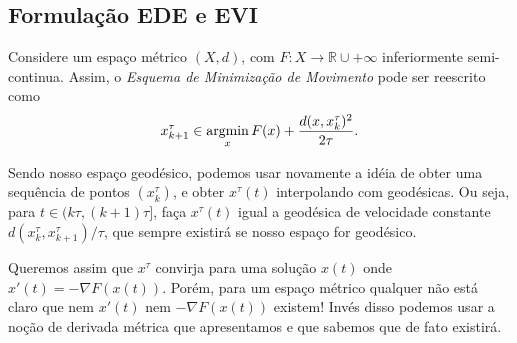 
\subsection{Formulação EDE e EVI}

Considere um espaço métrico $(X,d)$, com $F:X\to \mathbb R\cup{+\infty}$ inferiormente
semi-continua. Assim, o \textit{Esquema de Minimização de Movimento} pode ser
reescrito como
\begin{equation}
    x_{k+1}^\tau \in \mathop{\rm argmin}_x F(x) + \frac{d(x,x_k^\tau)^2}{2\tau}.
    \label{metricEMM}
\end{equation}

Sendo nosso espaço geodésico, podemos usar novamente a idéia de obter
uma sequência de pontos $(x_k^\tau)$, e obter $x^\tau(t)$ interpolando com geodésicas.
Ou seja, para $t \in (k\tau,(k+1)\tau]$, faça $x^\tau(t)$ igual a geodésica
de velocidade constante $d(x_k^\tau,x_{k+1}^\tau)/\tau$, que sempre existirá se
nosso espaço for geodésico.

Queremos assim que $x^\tau$ convirja para uma solução $x(t)$ onde
$x'(t) = -\nabla F(x(t))$. Porém, para um espaço métrico qualquer
não está claro que nem $x'(t)$ nem $-\nabla F(x(t))$ existem!
Invés disso podemos usar a noção de derivada métrica que apresentamos e
que sabemos que de fato existirá.


